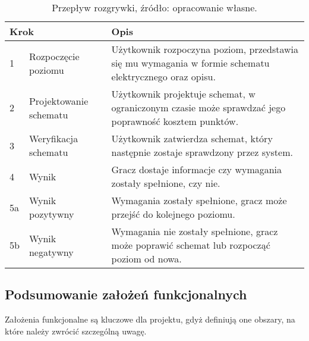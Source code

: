 \begin{table}[h]
    \centering
    \caption[Przepływ rozgrywki.]
    {Przepływ rozgrywki, źródło: opracowanie własne.}
    \label{tab:game_flow}
    \begin{tabular}{|l p{}|p{}|}
        \hline
        \multicolumn{2}{|l|}{Krok} & Opis \\
        \hline
        \hline
        1 & Rozpoczęcie poziomu &
        Użytkownik rozpoczyna poziom, przedstawia się mu wymagania w formie schematu elektrycznego oraz opisu. \\
        \hline
        2 & Projektowanie schematu &
        Użytkownik projektuje schemat, w ograniczonym czasie może sprawdzać jego poprawność kosztem punktów. \\
        \hline
        3 & Weryfikacja schematu &
        Użytkownik zatwierdza schemat, który następnie zostaje sprawdzony przez system. \\
        \hline
        4 & Wynik &
        Gracz dostaje informacje czy wymagania zostały spełnione, czy nie. \\
        \hline
        5a & Wynik pozytywny &
        Wymagania zostały spełnione, gracz może przejść do kolejnego poziomu. \\
        \hline
        5b & Wynik negatywny &
        Wymagania nie zostały spełnione, gracz może poprawić schemat lub rozpocząć poziom od nowa. \\
        \hline
    \end{tabular}
\end{table}


\subsection{Podsumowanie założeń funkcjonalnych}
\label{subsec:podsumowanie_zalozen_funkcjonalnych}

Założenia funkcjonalne są kluczowe dla projektu, gdyż definiują one obszary, na które należy zwrócić szczególną uwagę.

